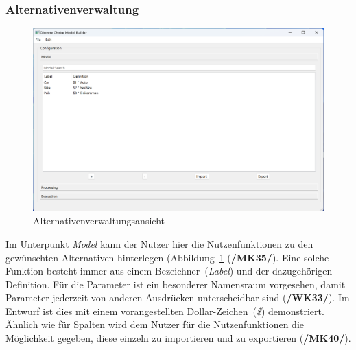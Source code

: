 \documentclass{article}
\begin{document}
\subsubsection{Alternativenverwaltung}
\begin{figure}[H]%
  \centering
  \includegraphics[width=12cm]{specifications/img/gui-screenshots/model.png}
  \caption{Alternativenverwaltungsansicht}
  \label{gui:fig_model}
\end{figure}
Im Unterpunkt \emph{Model} kann der Nutzer hier die Nutzenfunktionen zu den gewünschten Alternativen hinterlegen (Abbildung~\ref{gui:fig_model} (\textbf{/MK35/}). Eine solche Funktion besteht immer aus einem Bezeichner~(\emph{Label}) und der dazugehörigen Definition. Für die Parameter ist ein besonderer Namensraum vorgesehen, damit Parameter jederzeit von anderen Ausdrücken unterscheidbar sind (\textbf{/WK33/}). Im Entwurf ist dies mit einem vorangestellten Dollar-Zeichen~(\emph{\$}) demonstriert. Ähnlich wie für Spalten wird dem Nutzer für die Nutzenfunktionen die Möglichkeit gegeben, diese einzeln zu importieren und zu exportieren (\textbf{/MK40/}).\\
\end{document}

